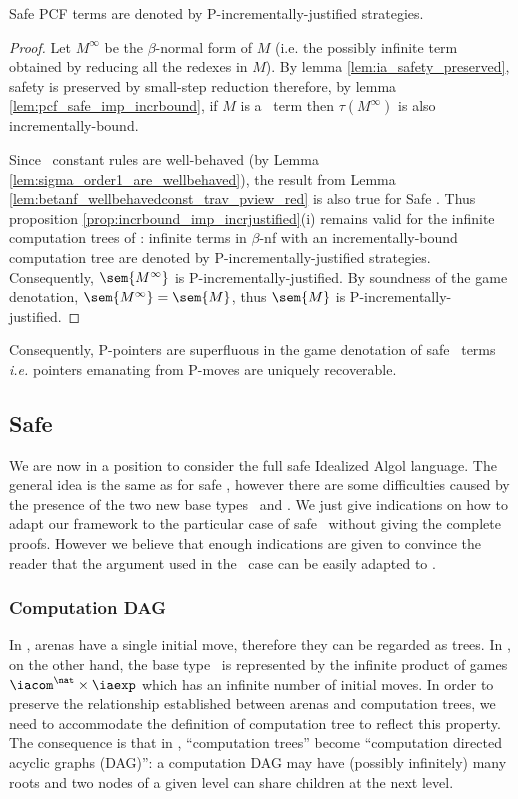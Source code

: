 \begin{theorem}
Safe PCF terms are denoted by P-incrementally-justified strategies.
\end{theorem}
\begin{proof}
Let $M^{\infty}$ be the $\beta$-normal form of $M$ (i.e. the possibly infinite term obtained by reducing all the redexes in $M$). By lemma \ref{lem:ia_safety_preserved}, safety is preserved by small-step reduction therefore, by lemma \ref{lem:pcf_safe_imp_incrbound}, if $M$ is a \pcf\ term then $\tau(M^{\infty})$ is also
incrementally-bound.

Since \pcf\ constant rules are well-behaved (by Lemma
\ref{lem:sigma_order1_are_wellbehaved}), the result from Lemma
\ref{lem:betanf_wellbehavedconst_trav_pview_red} is also true for
Safe \pcf. Thus proposition
\ref{prop:incrbound_imp_incrjustified}(i) remains valid for the
infinite computation trees of \pcf: infinite terms in $\beta$-nf
with an incrementally-bound computation tree are denoted by
P-incrementally-justified strategies. Consequently,
$\sem{M^{\infty}}$ is P-incrementally-justified. By soundness of the
game denotation, $\sem{M^{\infty}} = \sem{M}$, thus $\sem{M}$ is
P-incrementally-justified.
\end{proof}

Consequently, P-pointers are superfluous in the game denotation of safe \pcf\ terms {\it i.e.} pointers emanating from P-moves are uniquely recoverable.

\subsection{Safe \ialgol}

We are now in a position to consider the full safe Idealized Algol
language. The general idea is the same as for safe \pcf, however
there are some difficulties caused by the presence of the two new
base types \iavar\ and \iacom. We just give indications on how to
adapt our framework to the particular case of safe \ialgol\ without
giving the complete proofs. However we believe that enough
indications are given to convince the reader that the argument used
in the \pcf\ case can be easily adapted to \ialgol.

\subsubsection{Computation DAG}
In \pcf, arenas have a single initial move, therefore they can be
regarded as trees. In \ialgol, on the other hand, the base type
\iavar\ is represented by the infinite product of games
$\iacom^{\nat} \times \iaexp$ which has an infinite number of
initial moves. In order to preserve the relationship established
between arenas and computation trees, we need to accommodate the
definition of computation tree to reflect this property. The
consequence is that in \ialgol, ``computation trees'' become
``computation directed acyclic graphs (DAG)'': a computation DAG may
have (possibly infinitely) many roots and two nodes of a given level
can share children at the next level.


